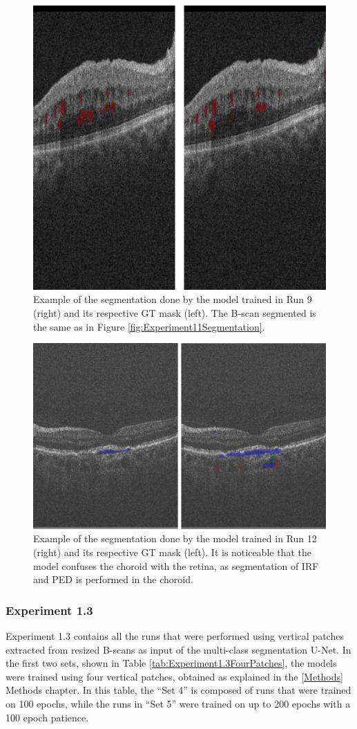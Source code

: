 \begin{figure}[!ht]
	\centering
	\includegraphics[width=0.5\linewidth]{figures/BigPatchSegmentationCirrus.png}
	\caption{Example of the segmentation done by the model trained in Run 9 (right) and its respective GT mask (left). The B-scan segmented is the same as in Figure \ref{fig:Experiment11Segmentation}.}
	\label{fig:BigPatchesSegmentationCirrus}
\end{figure}

\begin{figure}[!ht]
	\centering
	\includegraphics[width=0.6\linewidth]{figures/BigPatchSegmentationTopcon.png}
	\caption{Example of the segmentation done by the model trained in Run 12 (right) and its respective GT mask (left). It is noticeable that the model confuses the choroid with the retina, as segmentation of IRF and PED is performed in the choroid.}
	\label{fig:BigPatchesSegmentationTopcon}
\end{figure}

\subsubsection{Experiment 1.3}
Experiment 1.3 contains all the runs that were performed using vertical patches extracted from resized B-scans as input of the multi-class segmentation U-Net. In the first two sets, shown in Table \ref{tab:Experiment1.3FourPatches}, the models were trained using four vertical patches, obtained as explained in the \ref{Methods} Methods chapter. In this table, the ``Set 4'' is composed of runs that were trained on 100 epochs, while the runs in ``Set 5'' were trained on up to 200 epochs with a 100 epoch patience.

